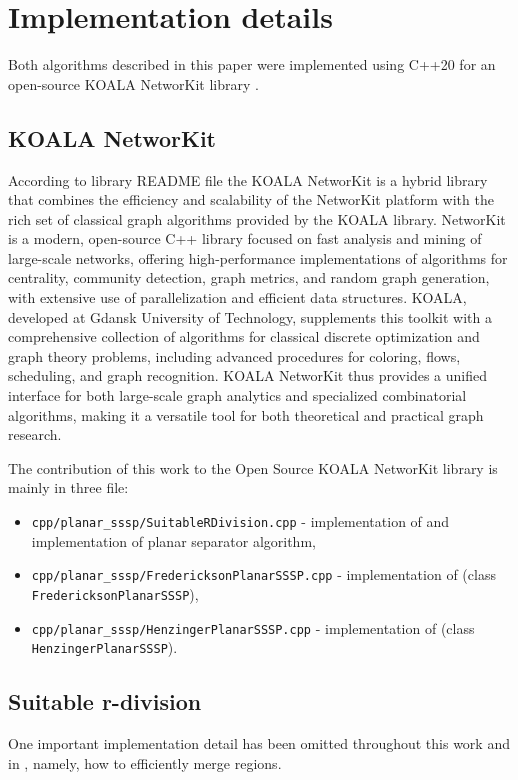 \section{Implementation details}

Both algorithms described in this paper were implemented using C++20 for an open-source KOALA NetworKit library \cite{koala-networkit}.
\subsection{KOALA NetworKit}
According to library README file the KOALA NetworKit is a hybrid library that combines the efficiency and scalability of the NetworKit platform with the rich set of classical graph algorithms provided by the KOALA library. NetworKit is a modern, open-source C++ library focused on fast analysis and mining of large-scale networks, offering high-performance implementations of algorithms for centrality, community detection, graph metrics, and random graph generation, with extensive use of parallelization and efficient data structures. KOALA, developed at Gdansk University of Technology, supplements this toolkit with a comprehensive collection of algorithms for classical discrete optimization and graph theory problems, including advanced procedures for coloring, flows, scheduling, and graph recognition. KOALA NetworKit thus provides a unified interface for both large-scale graph analytics and specialized combinatorial algorithms, making it a versatile tool for both theoretical and practical graph research.

The contribution of this work to the Open Source KOALA NetworKit library is mainly in three file:
\begin{itemize}
    \item \texttt{cpp/planar\_sssp/SuitableRDivision.cpp} - implementation of  and implementation of planar separator algorithm,
    
    \item \texttt{cpp/planar\_sssp/FredericksonPlanarSSSP.cpp} - implementation of  (class \texttt{FredericksonPlanarSSSP}),
    
    \item \texttt{cpp/planar\_sssp/HenzingerPlanarSSSP.cpp} - implementation of  (class \texttt{HenzingerPlanarSSSP}).
\end{itemize}

\subsection{Suitable r-division}
One important implementation detail has been omitted throughout this work and in \cite{frederickson}, namely, how to efficiently merge regions.

